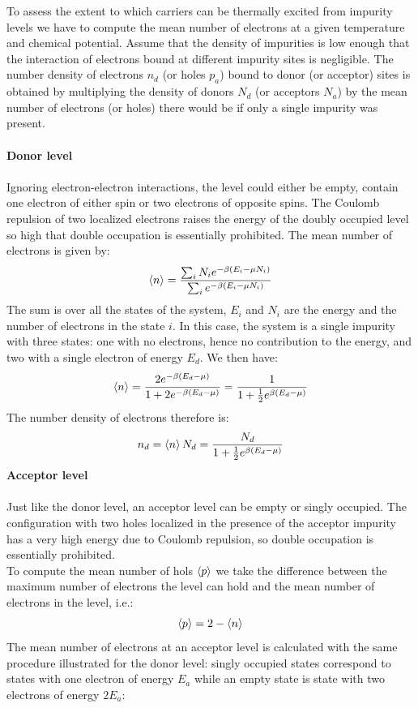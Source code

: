 \documentclass[10.75pt,a4paper,openright,bottom=2cm]{article}
\begin{document}
To assess the extent to which carriers can be thermally excited from impurity levels we have to compute the mean number of electrons at a given temperature and chemical potential. Assume that the density of impurities is low enough that the interaction of electrons bound at different impurity sites is negligible. The number density of electrons $n_d$ (or holes $p_a$) bound to donor (or acceptor) sites is obtained by multiplying the density of donors $N_d$ (or acceptors $N_a$) by the mean number of electrons (or holes) there would be if only a single impurity was present.\\\\
\textbf{Donor level}\\\\
Ignoring electron-electron interactions, the level could either be empty, contain one electron of either spin or two electrons of opposite spins. The Coulomb repulsion of two localized electrons raises the energy of the doubly occupied level so high that double occupation is essentially prohibited. The mean number of electrons is given by:
\[
\Braket{n}=\frac{\sum_iN_ie^{-\beta(E_i-\mu N_i)}}{\sum_ie^{-\beta(E_i-\mu N_i)}}
\]
The sum is over all the states of the system, $E_i$ and $N_i$ are the energy and the number of electrons in the state $i$. In this case, the system is a single impurity with three states: one with no electrons, hence no contribution to the energy, and two with a single electron of energy $E_d$. We then have:
\[
\Braket{n}=\frac{2e^{-\beta(E_d-\mu)}}{1+2e^{-\beta(E_d-\mu)}}=\frac{1}{1+\frac{1}{2}e^{\beta(E_d-\mu)}}
\]
The number density of electrons therefore is:
\[
n_d=\Braket{n}N_d=\frac{N_d}{1+\frac{1}{2}e^{\beta(E_d-\mu)}}
\]
\textbf{Acceptor level}\\\\
Just like the donor level, an acceptor level can be empty or singly occupied. The configuration with two holes localized in the presence of the acceptor impurity has a very high energy due to Coulomb repulsion, so double occupation is essentially prohibited.\\
To compute the mean number of hols $\Braket{p}$ we take the difference between the maximum number of electrons the level can hold and the mean number of electrons in the level, i.e.:
\[
\Braket{p}=2-\Braket{n}
\]
The mean number of electrons at an acceptor level is calculated with the same procedure illustrated for the donor level: singly occupied states correspond to states with one electron of energy $E_a$ while an empty state is state with two electrons of energy $2E_a$:
\end{document}

